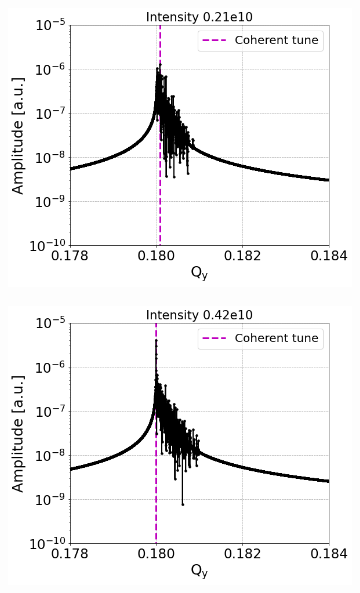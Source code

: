 \begin{figure}[htp]
    \centering
    \begin{subfigure}{.45\textwidth}
        \centering
        \includegraphics[width=.95\linewidth]{images/Ch7/fft_sps_forSchottky_tbt_270GeV_PN1e-8_WakesON_ayy6000_QpxQpy0_6D_Nb1e4_InialOffsetY1e-4m_turns1e6_IntensityScan_intensity0.21e10.png}  
        \label{fig:study_9a}
    \end{subfigure}
    \begin{subfigure}{.45\textwidth}
        \centering
        \includegraphics[width=.95\linewidth]{images/Ch7/fft_sps_forSchottky_tbt_270GeV_PN1e-8_WakesON_ayy6000_QpxQpy0_6D_Nb1e4_InialOffsetY1e-4m_turns1e6_IntensityScan_intensity0.42e10.png}

\end{subfigure}
\end{figure}
